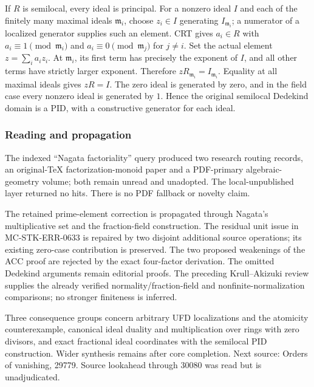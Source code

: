 If \(R\) is semilocal, every ideal is principal. For a nonzero ideal \(I\) and each of the finitely many maximal ideals \(\mathfrak m_i\), choose \(z_i\in I\) generating \(I_{\mathfrak m_i}\); a numerator of a localized generator supplies such an element. CRT gives \(a_i\in R\) with \(a_i\equiv1\pmod{\mathfrak m_i}\) and \(a_i\equiv0\pmod{\mathfrak m_j}\) for \(j\ne i\). Set the actual element \(z=\sum_i a_i z_i\). At \(\mathfrak m_i\), its first term has precisely the exponent of \(I\), and all other terms have strictly larger exponent. Therefore \(zR_{\mathfrak m_i}=I_{\mathfrak m_i}\). Equality at all maximal ideals gives \(zR=I\). The zero ideal is generated by zero, and in the field case every nonzero ideal is generated by \(1\). Hence the original semilocal Dedekind domain is a PID, with a constructive generator for each ideal.

\subsubsection{Reading and propagation}\label{algebra-proof-029-reading-and-propagation}

The indexed ``Nagata factoriality'' query produced two research routing records, an original-TeX factorization-monoid paper and a PDF-primary algebraic-geometry volume; both remain unread and unadopted. The local-unpublished layer returned no hits. There is no PDF fallback or novelty claim.

The retained prime-element correction is propagated through Nagata's multiplicative set and the fraction-field construction. The residual unit issue in MC-\AlgebraIdentifierBreak{}STK-\AlgebraIdentifierBreak{}ERR-\AlgebraIdentifierBreak{}0633 is repaired by two disjoint additional source operations; its existing zero-case contribution is preserved. The two proposed weakenings of the ACC proof are rejected by the exact four-factor derivation. The omitted Dedekind arguments remain editorial proofs. The preceding Krull--Akizuki review supplies the already verified normality/fraction-field and nonfinite-normalization comparisons; no stronger finiteness is inferred.

Three consequence groups concern arbitrary UFD localizations and the atomicity counterexample, canonical ideal duality and multiplication over rings with zero divisors, and exact fractional ideal coordinates with the semilocal PID construction. Wider synthesis remains after core completion. Next source: Orders of vanishing, 29779. Source lookahead through 30080 was read but is unadjudicated.
